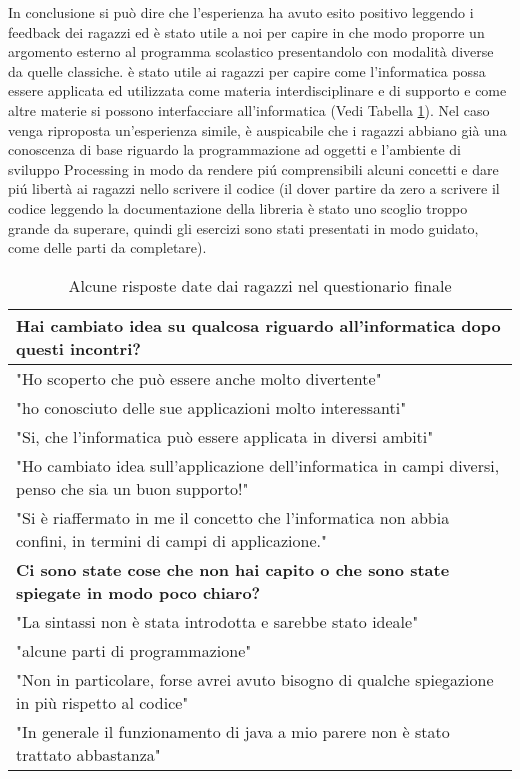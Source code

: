 In conclusione si può dire che l'esperienza ha avuto esito positivo leggendo i feedback dei ragazzi ed è stato utile a noi per capire in che modo proporre un argomento esterno al programma scolastico presentandolo con modalità diverse da quelle classiche. è stato utile ai ragazzi per capire come l'informatica possa essere applicata ed utilizzata come materia interdisciplinare e di supporto e come altre materie si possono interfacciare all'informatica (Vedi Tabella \ref{table:risposte_finali}). Nel caso venga riproposta un'esperienza simile, è auspicabile che i ragazzi abbiano già una conoscenza di base riguardo la programmazione ad oggetti e l'ambiente di sviluppo Processing in modo da rendere piú comprensibili alcuni concetti e dare piú libertà ai ragazzi nello scrivere il codice (il dover partire da zero a scrivere il codice leggendo la documentazione della libreria è stato uno scoglio troppo grande da superare, quindi gli esercizi sono stati presentati in modo guidato, come delle parti da completare).



\begin{center}
\def\arraystretch{1.3}
\begin{table}[!ht]

    \caption{Alcune risposte date dai ragazzi nel questionario finale}

    \begin{tabular}{p{}}
        
        \bfseries{Hai cambiato idea su qualcosa riguardo all'informatica dopo questi incontri?} \\
        \midrule
        "Ho scoperto che può essere anche molto divertente"  \\
        "ho conosciuto delle sue applicazioni molto interessanti" \\
        "Si, che l'informatica può essere applicata in diversi ambiti" \\
        "Ho cambiato idea sull'applicazione dell'informatica in campi diversi, penso che sia un buon supporto!" \\
        "Si è riaffermato in me il concetto che l'informatica non abbia confini, in termini di campi di applicazione." \\
        \midrule
        \bfseries{Ci sono state cose che non hai capito o che sono state spiegate in modo poco chiaro?} \\
        \midrule
        "La sintassi non è stata introdotta e sarebbe stato ideale" \\
        "alcune parti di programmazione" \\
        "Non in particolare, forse avrei avuto bisogno di qualche spiegazione in più rispetto al codice" \\
        "In generale il funzionamento di java a mio parere non è stato trattato abbastanza" \\
    \end{tabular}
    \label{table:risposte_finali}
\end{table}


\end{center}